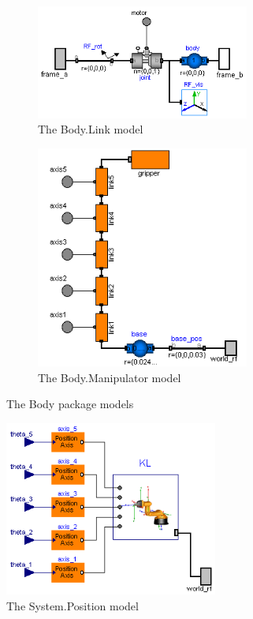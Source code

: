 \begin{figure}
	\centering
	\begin{subfigure}[htb]{0.48\textwidth}
	\centering
	\includegraphics[width=7cm]{images/Link}
	\caption{The Body.Link model}
	\label{fig:link-model}
	\vspace{0.5cm}	
	\end{subfigure}
	\begin{subfigure}[htb]{0.48\textwidth}
	\centering
	\includegraphics[width=7cm]{images/Manipulator}
	\caption{The Body.Manipulator model}
	\label{fig:body-manipulator-model}
	\end{subfigure}
	
	\caption{The Body package models}
	\label{fig:body-package-models}
	\vspace{0.5cm}
	\includegraphics[width=7cm]{images/ManipulatorSystem}
	\caption{The System.Position model}
	\label{fig:system-manipulator-model}
\end{figure}